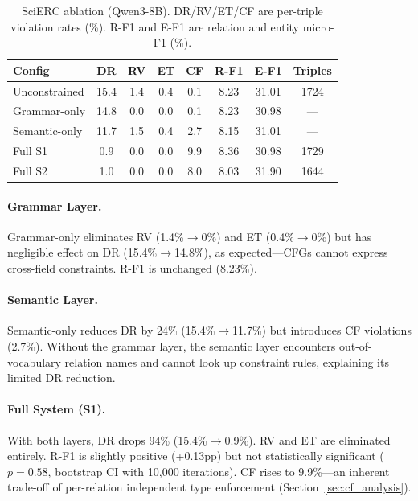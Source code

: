 \documentclass[11pt,a4paper]{article}
\begin{document}
\begin{table}[t]
\centering
\small
\caption{SciERC ablation (Qwen3-8B). DR/RV/ET/CF are per-triple violation rates (\%). R-F1 and E-F1 are relation and entity micro-F1 (\%).}
\label{tab:scierc_ablation}
\begin{tabular}{lccccccc}
\toprule
\textbf{Config} & \textbf{DR} & \textbf{RV} & \textbf{ET} & \textbf{CF} & \textbf{R-F1} & \textbf{E-F1} & \textbf{Triples} \\
\midrule
Unconstrained   & 15.4 & 1.4 & 0.4 & 0.1 & 8.23 & 31.01 & 1724 \\
Grammar-only    & 14.8 & 0.0 & 0.0 & 0.1 & 8.23 & 30.98 & --- \\
Semantic-only   & 11.7 & 1.5 & 0.4 & 2.7 & 8.15 & 31.01 & --- \\
Full S1         & 0.9  & 0.0 & 0.0 & 9.9 & 8.36 & 30.98 & 1729 \\
Full S2         & 1.0  & 0.0 & 0.0 & 8.0 & 8.03 & 31.90 & 1644 \\
\bottomrule
\end{tabular}
\end{table}

\paragraph{Grammar Layer.}
Grammar-only eliminates RV (1.4\%$\to$0\%) and ET (0.4\%$\to$0\%) but has negligible effect on DR (15.4\%$\to$14.8\%), as expected---CFGs cannot express cross-field constraints. R-F1 is unchanged (8.23\%).

\paragraph{Semantic Layer.}
Semantic-only reduces DR by 24\% (15.4\%$\to$11.7\%) but introduces CF violations (2.7\%). Without the grammar layer, the semantic layer encounters out-of-vocabulary relation names and cannot look up constraint rules, explaining its limited DR reduction.

\paragraph{Full System (S1).}
With both layers, DR drops 94\% (15.4\%$\to$0.9\%). RV and ET are eliminated entirely. R-F1 is slightly positive (+0.13pp) but not statistically significant ($p{=}0.58$, bootstrap CI with 10,000 iterations). CF rises to 9.9\%---an inherent trade-off of per-relation independent type enforcement (Section~\ref{sec:cf_analysis}).
\end{document}
